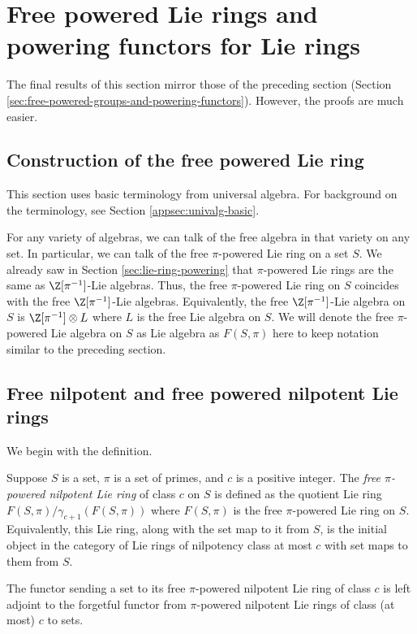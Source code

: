 \documentclass{ucetd}
\begin{document}
\section{Free powered Lie rings and powering functors for Lie rings}\label{sec:free-powered-lie-rings-and-powering-functors}

The final results of this section mirror those of the preceding
section (Section
\ref{sec:free-powered-groups-and-powering-functors}). However, the
proofs are much easier.
\subsection{Construction of the free powered Lie ring}

This section uses basic terminology from universal algebra. For
background on the terminology, see Section
\ref{appsec:univalg-basic}.

For any variety of algebras, we can talk of the free algebra in that
variety on any set. In particular, we can talk of the free
$\pi$-powered Lie ring on a set $S$. We already saw in Section
\ref{sec:lie-ring-powering} that $\pi$-powered Lie rings are the same
as $\Z[\pi^{-1}]$-Lie algebras. Thus, the free $\pi$-powered Lie ring
on $S$ coincides with the free $\Z[\pi^{-1}]$-Lie
algebras. Equivalently, the free $\Z[\pi^{-1}]$-Lie algebra on $S$ is
$\Z[\pi^{-1}] \otimes L$ where $L$ is the free Lie algebra on $S$. We
will denote the free $\pi$-powered Lie algebra on $S$ as Lie algebra
as $F(S,\pi)$ here to keep notation similar to the preceding section.

\subsection{Free nilpotent and free powered nilpotent Lie rings}\label{sec:free-powered-nilpotent-lie}

We begin with the definition.

\begin{definer}
  Suppose $S$ is a set, $\pi$ is a set of primes, and $c$ is a
  positive integer. The {\em free $\pi$-powered nilpotent Lie ring} of
  class $c$ on $S$ is defined as the quotient Lie ring
  $F(S,\pi)/\gamma_{c+1}(F(S,\pi))$ where $F(S,\pi)$ is the free
  $\pi$-powered Lie ring on $S$. Equivalently, this Lie ring, along
  with the set map to it from $S$, is the initial object in the
  category of Lie rings of nilpotency class at most $c$ with set maps to
  them from $S$.

  The functor sending a set to its free $\pi$-powered nilpotent Lie ring
  of class $c$ is left adjoint to the forgetful functor from
  $\pi$-powered nilpotent Lie rings of class (at most) $c$ to sets.
\end{definer}
\end{document}
